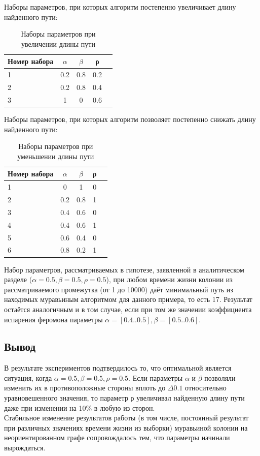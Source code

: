 \documentclass[../main.tex]{subfiles}
\begin{document}
	Наборы параметров, при которых алгоритм постепенно увеличивает длину найденного пути:
	
	\begin{table}[ht]
		\caption{Наборы параметров при увеличении длины пути}
		\begin{tabular}{|l|c|c|c|c|}
			\hline
			Номер набора & $\alpha$ & $\beta$ & ρ\\
			\hline
			\hline
			1 & 0.2 & 0.8 & 0.2 \\
			\hline
			2 & 0.2 & 0.8 & 0.4 \\
			\hline
			3 & 1 & 0 & 0.6 \\
			\hline
		\end{tabular}
		\label{tab:tabular}
	\end{table}
	
	Наборы параметров, при которых алгоритм позволяет постепенно снижать длину найденного пути:
	
	\begin{table}[ht]
		\caption{Наборы параметров при уменьшении длины пути}
		\begin{tabular}{|l|c|c|c|c|}
			\hline
			Номер набора & $\alpha$ & $\beta$ & ρ\\
			\hline
			\hline
			1 & 0 & 1 & 0 \\
			\hline
			2 & 0.2 & 0.8 & 1 \\
			\hline
			3 & 0.4 & 0.6 & 0 \\
			\hline
			4 & 0.4 & 0.6 & 1 \\
			\hline
			5 & 0.6 & 0.4 & 0 \\
			\hline
			6 & 0.8 & 0.2 & 1 \\
			\hline
		\end{tabular}
		\label{tab:tabular}
	\end{table}

	Набор параметров, рассматриваемых в гипотезе, заявленной в аналитическом разделе ($\alpha = 0.5, \beta = 0.5, ρ = 0.5$), при любом времени жизни колонии из рассматриваемого промежутка (от 1 до 10000) даёт минимальный путь из находимых муравьиным алгоритмом для данного примера, то есть 17. Результат остаётся аналогичным и в том случае, если при том же значении коэффициента испарения феромона параметры $\alpha = [0.4..0.5], \beta = [0.5..0.6]$.
	
\subsection{Вывод}

	В результате экспериментов подтвердилось то, что оптимальной является ситуация, когда $\alpha = 0.5, \beta = 0.5, ρ = 0.5$. Если параметры $\alpha$ и $\beta$ позволяли изменить их в противоположные стороны вплоть до $\Delta0.1$ относительно уравновешенного значения, то параметр ρ увеличивал найденную длину пути даже при изменении на 10\% в любую из сторон. \\
	
	Стабильное изменение результатов работы (в том числе, постоянный результат при различных значениях времени жизни из выборки) муравьиной колонии на неориентированном графе сопровождалось тем, что параметры начинали вырождаться.
	
\end{document}
